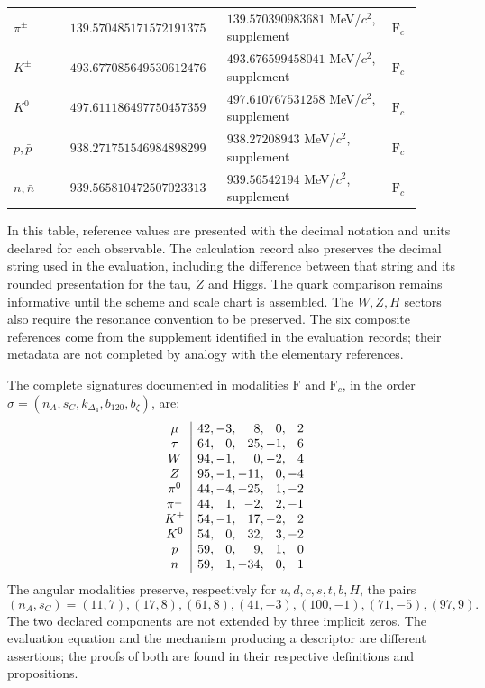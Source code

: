 \begin{table}[!htbp]
\begin{tabular}{p{0.13\linewidth}p{0.32\linewidth}p{0.38\linewidth}p{0.07\linewidth}}
\(\pi^\pm\) & \(139.570485171\allowbreak572191375\) & \(139.570390983681\) MeV/\(c^2\), supplement & \(\mathrm F_c\)\\
\(K^\pm\) & \(493.677085649\allowbreak530612476\) & \(493.676599458041\) MeV/\(c^2\), supplement & \(\mathrm F_c\)\\
\(K^0\) & \(497.611186497\allowbreak750457359\) & \(497.610767531258\) MeV/\(c^2\), supplement & \(\mathrm F_c\)\\
\(p,\bar p\) & \(938.271751546\allowbreak984898299\) & \(938.27208943\) MeV/\(c^2\), supplement & \(\mathrm F_c\)\\
\(n,\bar n\) & \(939.565810472\allowbreak507023313\) & \(939.56542194\) MeV/\(c^2\), supplement & \(\mathrm F_c\)\\
\end{tabular}
\end{table}
\endgroup

In this table, reference values are presented with the decimal
notation and units declared for each observable. The calculation
record also preserves the decimal string used in the evaluation,
including the difference between that string and its rounded presentation for
the tau, \(Z\) and Higgs. The quark comparison
remains informative until the scheme and scale chart is assembled.
The \(W,Z,H\) sectors also require the resonance convention
to be preserved. The six composite references come from the supplement
identified in the evaluation records; their metadata are not completed
by analogy with the elementary references.

The complete signatures documented in modalities \(\mathrm F\) and
\(\mathrm F_c\), in the order
\(\sigma=(n_A,s_C,k_{\Delta_4},b_{120},b_\zeta)\), are:
\[
\begin{array}{c|r@{,\,}r@{,\,}r@{,\,}r@{,\,}r}
\mu&42&-3&8&0&2\\
\tau&64&0&25&-1&6\\
W&94&-1&0&-2&4\\
Z&95&-1&-11&0&-4\\
\pi^0&44&-4&-25&1&-2\\
\pi^\pm&44&1&-2&2&-1\\
K^\pm&54&-1&17&-2&2\\
K^0&54&0&32&3&-2\\
p&59&0&9&1&0\\
n&59&1&-34&0&1
\end{array}
\]
The angular modalities preserve, respectively for
\(u,d,c,s,t,b,H\), the pairs
\[
(n_A,s_C)=(11,7),(17,8),(61,8),(41,-3),(100,-1),(71,-5),(97,9).
\]
The two declared components are not extended by
three implicit zeros. The evaluation equation and the mechanism
producing a descriptor are different assertions; the proofs of both
are found in their respective definitions and propositions.

